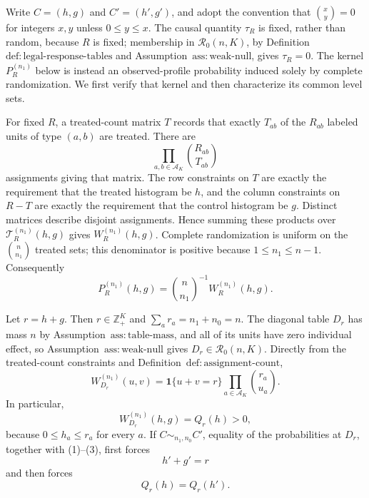 Write \(C=(h,g)\) and \(C'=(h',g')\), and adopt the convention that \(\binom{x}{y}=0\) for integers \(x,y\) unless \(0\leq y\leq x\).  The causal quantity \(\tau_R\) is fixed, rather than random, because \(R\) is fixed; membership in \(\mathcal R_0(n,K)\), by Definition~\(\mathrm{def:legal\mbox{-}response\mbox{-}tables}\) and Assumption~\(\mathrm{ass:weak\mbox{-}null}\), gives \(\tau_R=0\).  The kernel \(P_R^{(n_1)}\) below is instead an observed-profile probability induced solely by complete randomization.  We first verify that kernel and then characterize its common level sets.

For fixed \(R\), a treated-count matrix \(T\) records that exactly \(T_{ab}\) of the \(R_{ab}\) labeled units of type \((a,b)\) are treated.  There are
\[
 \prod_{a,b\in\mathcal A_K}\binom{R_{ab}}{T_{ab}}
\]
assignments giving that matrix.  The row constraints on \(T\) are exactly the requirement that the treated histogram be \(h\), and the column constraints on \(R-T\) are exactly the requirement that the control histogram be \(g\).  Distinct matrices describe disjoint assignments.  Hence summing these products over \(\mathcal T_R^{(n_1)}(h,g)\) gives \(W_R^{(n_1)}(h,g)\).  Complete randomization is uniform on the \(\binom n{n_1}\) treated sets; this denominator is positive because \(1\leq n_1\leq n-1\).  Consequently
\[
 P_R^{(n_1)}(h,g)=\binom n{n_1}^{-1}W_R^{(n_1)}(h,g).
 \tag{1}
\]

Let \(r=h+g\).  Then \(r\in\mathbb Z_+^K\) and \(\sum_a r_a=n_1+n_0=n\).  The diagonal table \(D_r\) has mass \(n\) by Assumption~\(\mathrm{ass:table\mbox{-}mass}\), and all of its units have zero individual effect, so Assumption~\(\mathrm{ass:weak\mbox{-}null}\) gives \(D_r\in\mathcal R_0(n,K)\).  Directly from the treated-count constraints and Definition~\(\mathrm{def:assignment\mbox{-}count}\),
\[
 W_{D_r}^{(n_1)}(u,v)
 =\mathbf 1\{u+v=r\}\prod_{a\in\mathcal A_K}\binom{r_a}{u_a}.
 \tag{2}
\]
In particular,
\[
 W_{D_r}^{(n_1)}(h,g)=Q_r(h)>0,
 \tag{3}
\]
because \(0\leq h_a\leq r_a\) for every \(a\).  If \(C\sim_{n_1,n_0}C'\), equality of the probabilities at \(D_r\), together with (1)--(3), first forces
\[
 h'+g'=r
 \tag{4}
\]
and then forces
\[
 Q_r(h)=Q_r(h').
 \tag{5}
\]

